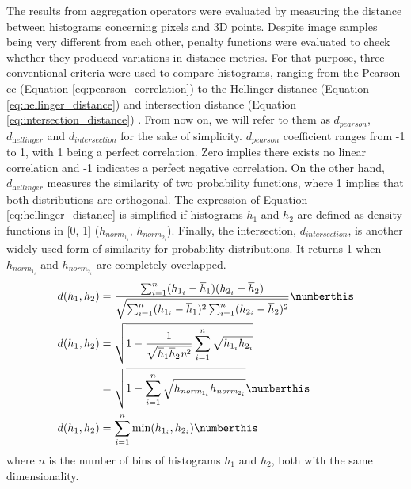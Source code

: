 The results from aggregation operators were evaluated by measuring the distance between histograms concerning pixels and 3D points. Despite image samples being very different from each other, penalty functions were evaluated to check whether they produced variations in distance metrics. For that purpose, three conventional criteria were used to compare histograms, ranging from the Pearson \acrshort{cc} (Equation \ref{eq:pearson_correlation}) to the Hellinger distance (Equation \ref{eq:hellinger_distance}) and intersection distance (Equation \ref{eq:intersection_distance}) \cite{cha_comprehensive_2007}. From now on, we will refer to them as $d_{\textit{pearson}}$, $d_{\textit{hellinger}}$ and $d_{\textit{intersection}}$ for the sake of simplicity. $d_{\textit{pearson}}$ coefficient ranges from -1 to 1, with 1 being a perfect correlation. Zero implies there exists no linear correlation and -1 indicates a perfect negative correlation. On the other hand, $d_{\textit{hellinger}}$ measures the similarity of two probability functions, where 1 implies that both distributions are orthogonal. The expression of Equation \ref{eq:hellinger_distance} is simplified if histograms $h_1$ and $h_2$ are defined as density functions in [0, 1] ($h_{\textit{norm}_{1_{i}}}$, $h_{\textit{norm}_{2_{i}}}$). Finally, the intersection, $d_{\textit{intersection}}$, is another widely used form of similarity for probability distributions. It returns 1 when $h_{\textit{norm}_{1_{i}}}$ and $h_{\textit{norm}_{2_{i}}}$ are completely overlapped. 
\begin{align*}
    d(h_1, h_2) &= \frac{\sum_{i=1}^{n} (h_{1_{i}} - \overline{h}_{1}) (h_{2_{i}} - \overline{h}_{2})}{\sqrt{\sum_{i=1}^{n} (h_{1_{i}} - \overline{h}_{1})^2 \sum_{i=1}^{n} (h_{2_{i}} - \overline{h}_{2})^2}}
    \numberthis \label{eq:pearson_correlation}\\
    d(h_1, h_2)
    &=\sqrt{1 - \frac{1}{\sqrt{\overline{h}_1 \overline{h}_2 \textit{n}^2}} \sum_{i=1}^{n} \sqrt{h_{1_{i}}h_{2_{i}}}}\\
    &=\sqrt{1 - \sum_{i=1}^{n} \sqrt{h_{\textit{norm}_{1_{i}}}h_{\textit{norm}_{2_{i}}}}}
    \numberthis \label{eq:hellinger_distance}\\
    d(h_1, h_2)
    &=\sum_{i=1}^{n} \min(h_{1_{i}}, h_{2_{i}})
    \numberthis \label{eq:intersection_distance}
\end{align*}
where $n$ is the number of bins of histograms $h_1$ and $h_2$, both with the same dimensionality.

